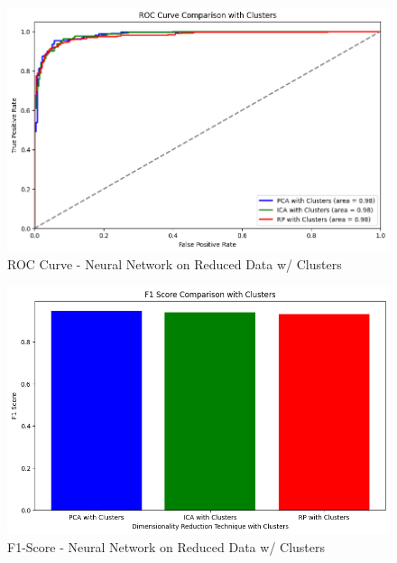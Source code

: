 \documentclass[conference]{IEEEtran}
\begin{document}
\begin{figure}
    \centering
    \includegraphics[width=1\linewidth]{figures//housing_figures/ROC_curve_dim_red_clusters.png}
    \caption{ROC Curve - Neural Network on Reduced Data w/ Clusters}
    \label{fig:Roc-Curve}
\end{figure}
\begin{figure}
    \centering
    \includegraphics[width=1\linewidth]{figures//housing_figures/f1_score_dim_red_ cluster.png}
    \caption{F1-Score - Neural Network on Reduced Data w/ Clusters}
    \label{fig:enter-label}
\end{figure}\\\\\\\\\\\\\\\\\
\end{document}

